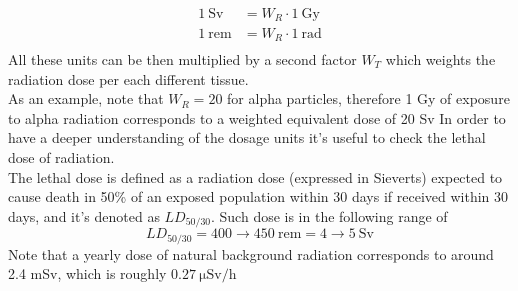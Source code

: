 \documentclass[../qm.tex]{subfiles}
\begin{document}
\begin{equation*}
	\begin{aligned}
		1\ \mathrm{Sv}&=W_R\cdot1\ \mathrm{Gy}\\
		1\ \mathrm{rem}&=W_R\cdot1\ \mathrm{rad}\\
	\end{aligned}
\end{equation*}
All these units can be then multiplied by a second factor $W_T$ which weights the radiation dose per each different tissue.\\
As an example, note that $W_R=20$ for alpha particles, therefore 1 Gy of exposure to alpha radiation corresponds to a weighted equivalent dose of 20 Sv
In order to have a deeper understanding of the dosage units it's useful to check the lethal dose of radiation.\\
The lethal dose is defined as a radiation dose (expressed in Sieverts) expected to cause death in 50\% of an exposed population within 30 days if received within 30 days, and it's denoted as $LD_{50/30}$. Such dose is in the following range of
\begin{equation*}
	LD_{50/30}=400\to450\ \mathrm{rem}=4\to5\ \mathrm{Sv}
\end{equation*}
Note that a yearly dose of natural background radiation corresponds to around 2.4 mSv, which is roughly $0.27\ \mathrm{\mu Sv/h}$
\end{document}
